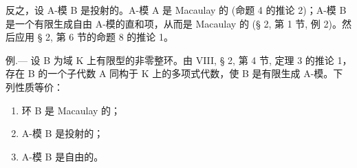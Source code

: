 反之，设 A-模 B 是投射的。A-模 A 是 Macaulay 的 (命题 4 的推论 2)；A-模 B 是一个有限生成自由 A-模的直和项，从而是 Macaulay 的 (§ 2, 第 1 节, 例 2)。然后应用 § 2, 第 6 节的命题 8 的推论 1。

例.--- 设 B 为域 K 上有限型的非零整环。由 VIII, § 2, 第 4 节, 定理 3 的推论 1，存在 B 的一个子代数 A 同构于 K 上的多项式代数，使 B 是有限生成 A-模。下列性质等价：

\begin{enumerate}
\def\labelenumi{(\roman{enumi})}
\item
  环 B 是 Macaulay 的；
\item
  A-模 B 是投射的；
\item
  A-模 B 是自由的。
\end{enumerate}

